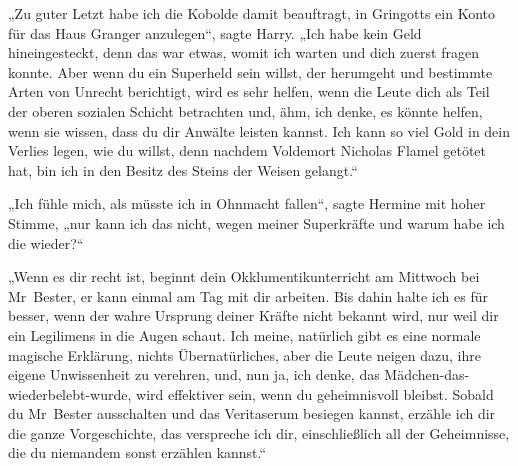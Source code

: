 „Zu guter Letzt habe ich die Kobolde damit beauftragt, in Gringotts ein Konto für das Haus Granger anzulegen“, sagte Harry.
„Ich habe kein Geld hineingesteckt, denn das war etwas, womit ich warten und dich zuerst fragen konnte. Aber wenn du ein Superheld sein willst, der herumgeht und bestimmte Arten von Unrecht berichtigt, wird es sehr helfen, wenn die Leute dich als Teil der oberen sozialen Schicht betrachten und, ähm, ich denke, es könnte helfen, wenn sie wissen, dass du dir Anwälte leisten kannst. Ich kann so viel Gold in dein Verlies legen, wie du willst, denn nachdem Voldemort Nicholas Flamel getötet hat, bin ich in den Besitz des Steins der Weisen gelangt.“

„Ich fühle mich, als müsste ich in Ohnmacht fallen“, sagte Hermine mit hoher Stimme, „nur kann ich das nicht, wegen meiner Superkräfte und warum habe ich die wieder?“

„Wenn es dir recht ist, beginnt dein Okklumentikunterricht am Mittwoch bei Mr~Bester, er kann einmal am Tag mit dir arbeiten. Bis dahin halte ich es für besser, wenn der wahre Ursprung deiner Kräfte nicht bekannt wird, nur weil dir ein Legilimens in die Augen schaut. Ich meine, natürlich gibt es eine normale magische Erklärung, nichts Übernatürliches, aber die Leute neigen dazu, ihre eigene Unwissenheit zu verehren, und, nun ja, ich denke, das Mädchen-das-wiederbelebt-wurde, wird effektiver sein, wenn du geheimnisvoll bleibst. Sobald du Mr~Bester ausschalten und das Veritaserum besiegen kannst, erzähle ich dir die ganze Vorgeschichte, das verspreche ich dir, einschließlich all der Geheimnisse, die du niemandem sonst erzählen kannst.“

